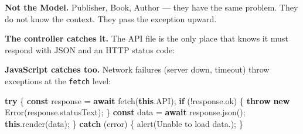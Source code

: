 \documentclass[11pt,a4paper,oneside]{book}
\newenvironment{Shaded}{\begin{snugshade}}{\end{snugshade}}
\newcommand{\KeywordTok}[1]{\textcolor[HTML]{007020}{\textbf{#1}}}
\newcommand{\DecValTok}[1]{\textcolor[HTML]{40A070}{#1}}
\newcommand{\ConstantTok}[1]{\textcolor[HTML]{880000}{#1}}
\newcommand{\StringTok}[1]{\textcolor[HTML]{4070A0}{#1}}
\newcommand{\CommentTok}[1]{\textcolor[HTML]{60A0B0}{\textit{#1}}}
\newcommand{\OtherTok}[1]{\textcolor[HTML]{007020}{#1}}
\newcommand{\FunctionTok}[1]{\textcolor[HTML]{06287E}{#1}}
\newcommand{\VariableTok}[1]{\textcolor[HTML]{19177C}{#1}}
\newcommand{\ControlFlowTok}[1]{\textcolor[HTML]{007020}{\textbf{#1}}}
\newcommand{\OperatorTok}[1]{\textcolor[HTML]{666666}{#1}}
\newcommand{\BuiltInTok}[1]{#1}
\newcommand{\AttributeTok}[1]{\textcolor[HTML]{7D9029}{#1}}
\newcommand{\NormalTok}[1]{#1}
\begin{document}
\textbf{Not the Model.} Publisher, Book, Author --- they have the
same problem. They do not know the context. They pass the
exception upward.

\textbf{The controller catches it.} The API file is the only
place that knows it must respond with JSON and an HTTP status
code:

\begin{Shaded}
\end{Shaded}

\textbf{JavaScript catches too.} Network failures (server down,
timeout) throw exceptions at the \texttt{fetch} level:

\begin{Shaded}
\begin{Highlighting}[]
\ControlFlowTok{try}\NormalTok{ \{}
    \KeywordTok{const}\NormalTok{ response }\OperatorTok{=} \ControlFlowTok{await} \FunctionTok{fetch}\NormalTok{(}\KeywordTok{this}\OperatorTok{.}\AttributeTok{API}\NormalTok{)}\OperatorTok{;}
    \ControlFlowTok{if}\NormalTok{ (}\OperatorTok{!}\NormalTok{response}\OperatorTok{.}\AttributeTok{ok}\NormalTok{) \{}
        \ControlFlowTok{throw} \KeywordTok{new} \BuiltInTok{Error}\NormalTok{(response}\OperatorTok{.}\AttributeTok{statusText}\NormalTok{)}\OperatorTok{;}
\NormalTok{    \}}
    \KeywordTok{const}\NormalTok{ data }\OperatorTok{=} \ControlFlowTok{await}\NormalTok{ response}\OperatorTok{.}\FunctionTok{json}\NormalTok{()}\OperatorTok{;}
    \KeywordTok{this}\OperatorTok{.}\FunctionTok{render}\NormalTok{(data)}\OperatorTok{;}
\NormalTok{\} }\ControlFlowTok{catch}\NormalTok{ (error) \{}
    \FunctionTok{alert}\NormalTok{(}\StringTok{\textquotesingle{}Unable to load data.\textquotesingle{}}\NormalTok{)}\OperatorTok{;}
\NormalTok{\}}
\end{Highlighting}
\end{Shaded}
\end{document}
